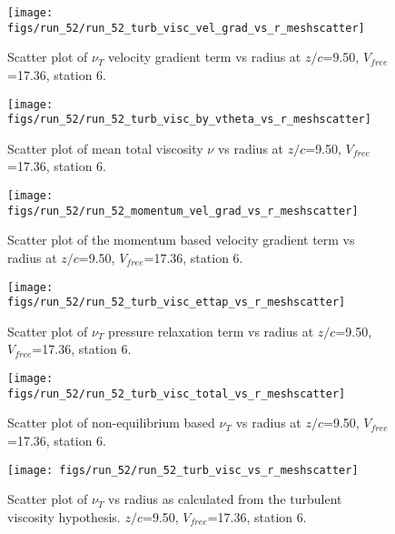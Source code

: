 \begin{figure}[H]
\centering
\texttt{[image: figs/run\_52/run\_52\_turb\_visc\_vel\_grad\_vs\_r\_meshscatter]}
\caption{Scatter plot of $\nu_T$ velocity gradient term vs radius at $z/c$=9.50, $V_{free}$=17.36, station 6.}
\end{figure}


\begin{figure}[H]
\centering
\texttt{[image: figs/run\_52/run\_52\_turb\_visc\_by\_vtheta\_vs\_r\_meshscatter]}
\caption{Scatter plot of mean total viscosity $\nu$ vs radius at $z/c$=9.50, $V_{free}$=17.36, station 6.}
\end{figure}


\begin{figure}[H]
\centering
\texttt{[image: figs/run\_52/run\_52\_momentum\_vel\_grad\_vs\_r\_meshscatter]}
\caption{Scatter plot of the momentum based velocity gradient term vs radius at $z/c$=9.50, $V_{free}$=17.36, station 6.}
\end{figure}


\begin{figure}[H]
\centering
\texttt{[image: figs/run\_52/run\_52\_turb\_visc\_ettap\_vs\_r\_meshscatter]}
\caption{Scatter plot of $\nu_T$ pressure relaxation term vs radius at $z/c$=9.50, $V_{free}$=17.36, station 6.}
\end{figure}


\begin{figure}[H]
\centering
\texttt{[image: figs/run\_52/run\_52\_turb\_visc\_total\_vs\_r\_meshscatter]}
\caption{Scatter plot of non-equilibrium based $\nu_T$ vs radius at $z/c$=9.50, $V_{free}$=17.36, station 6.}
\end{figure}


\begin{figure}[H]
\centering
\texttt{[image: figs/run\_52/run\_52\_turb\_visc\_vs\_r\_meshscatter]}
\caption{Scatter plot of $\nu_T$ vs radius as calculated from the turbulent viscosity hypothesis. $z/c$=9.50, $V_{free}$=17.36, station 6.}
\end{figure}


